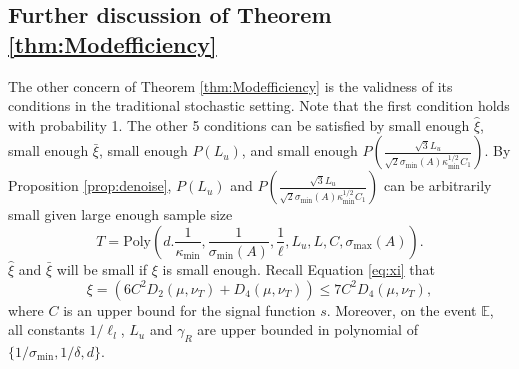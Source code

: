 \documentclass[twoside]{article}
\newcommand{\E}{\mathbb{E}}
\theoremstyle{definition}
\begin{document}
\subsection{Further discussion of Theorem \ref{thm:Modefficiency}}
 \label{subsec:ThminStocSetting}
The other concern of Theorem \ref{thm:Modefficiency} is the validness of its conditions in the traditional stochastic setting. 
Note that the first condition holds with probability 1. 
The other 5 conditions can be satisfied by small enough 
$\widehat{\xi}$, small enough $\bar{\xi}$, small enough $P(L_u)$, and small enough $P\left(\frac{\sqrt{3}L_u}{\sqrt{2}\sigma_{\min}(A)\kappa_{\min}^{1/2}C_1}\right)$.
By Proposition \ref{prop:denoise}, $P(L_u)$ and $P\left(\frac{\sqrt{3}L_u}{\sqrt{2}\sigma_{\min}(A)\kappa_{\min}^{1/2}C_1}\right)$ can be arbitrarily small given large enough sample size 
\[T = \text{Poly}(d.\frac{1}{\kappa_{\min}}, \frac{1}{\sigma_{\min}(A)}, \frac{1}{\ell}, L_u, L, C, \sigma_{\max}(A)).\] 
$\widehat{\xi}$ and $\bar{\xi}$ will be small if $\xi$ is small enough.
Recall Equation \eqref{eq:xi} that 
\[\xi = \left( 6C^2D_2(\mu, \nu_T) + D_4(\mu, \nu_T)\right) \le 7C^2D_4(\mu, \nu_T),\]
where $C$ is an upper bound for the signal function $s$.
Moreover, on the event $\E$, all constants $1/\ell_l$, $L_u$ and $\gamma_R$ are upper bounded in polynomial of $\{ 1/\sigma_{\min}, 1/\delta, d\}$. 
\end{document}
